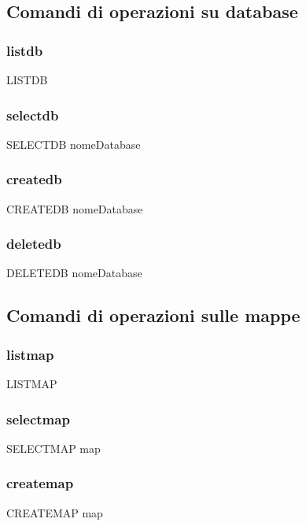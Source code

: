 \documentclass[a4paper]{article}
\begin{document}
		\subsection{Comandi di operazioni su database}
			\subsubsection{listdb}
			\begin{center}
				LISTDB 
			\end{center}
			\subsubsection{selectdb}
			\begin{center}
				SELECTDB nomeDatabase
			\end{center}
			\subsubsection{createdb}
			\begin{center}
				CREATEDB nomeDatabase
			\end{center}
			\subsubsection{deletedb}
			\begin{center}
				DELETEDB nomeDatabase
			\end{center}
		\subsection{Comandi di operazioni sulle mappe}
			\subsubsection{listmap}
			\begin{center}
				LISTMAP
			\end{center}
			\subsubsection{selectmap}
			\begin{center}
				SELECTMAP map
			\end{center}
			\subsubsection{createmap}
			\begin{center}
				CREATEMAP map
			\end{center}
\end{document}
